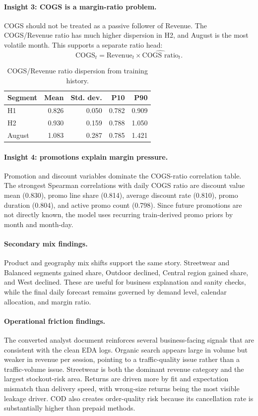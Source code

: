 \paragraph{Insight 3: COGS is a margin-ratio problem.}
COGS should not be treated as a passive follower of Revenue. The COGS/Revenue ratio has much higher dispersion in H2, and August is the most volatile month. This supports a separate ratio head:
\[
  \text{COGS}_t = \text{Revenue}_t \times \widehat{\text{COGS ratio}}_t.
\]

\begin{table}[h]
\centering
\caption{COGS/Revenue ratio dispersion from training history.}
\label{tab:ratio_dispersion}
\begin{tabular}{lrrrr}
\toprule
Segment & Mean & Std. dev. & P10 & P90 \\
\midrule
H1 & 0.826 & 0.050 & 0.782 & 0.909 \\
H2 & 0.930 & 0.159 & 0.788 & 1.050 \\
August & 1.083 & 0.287 & 0.785 & 1.421 \\
\bottomrule
\end{tabular}
\end{table}

\paragraph{Insight 4: promotions explain margin pressure.}
Promotion and discount variables dominate the COGS-ratio correlation table. The strongest Spearman correlations with daily COGS ratio are discount value mean (0.830), promo line share (0.814), average discount rate (0.810), promo duration (0.804), and active promo count (0.798). Since future promotions are not directly known, the model uses recurring train-derived promo priors by month and month-day.

\paragraph{Secondary mix findings.}
Product and geography mix shifts support the same story. Streetwear and Balanced segments gained share, Outdoor declined, Central region gained share, and West declined. These are useful for business explanation and sanity checks, while the final daily forecast remains governed by demand level, calendar allocation, and margin ratio.

\paragraph{Operational friction findings.}
The converted analyst document reinforces several business-facing signals that are consistent with the clean EDA logs. Organic search appears large in volume but weaker in revenue per session, pointing to a traffic-quality issue rather than a traffic-volume issue. Streetwear is both the dominant revenue category and the largest stockout-risk area. Returns are driven more by fit and expectation mismatch than delivery speed, with wrong-size returns being the most visible leakage driver. COD also creates order-quality risk because its cancellation rate is substantially higher than prepaid methods.
